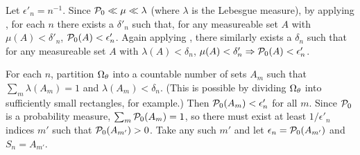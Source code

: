 \begin{lem}
%
Let $\epsilon'_n = n^{-1}$.  Since $\mathcal{P}_{0} \ll \mu \ll \lambda$ (where $\lambda$
is the Lebesgue measure), by applying \citet[Proposition
15.5]{nielsen:1997:measure}, for each $n$ there exists a $\delta'_n$ such that,
for any measureable set $A$ with $\mu(A) < \delta'_n$, $\mathcal{P}_{0}(A) <
\epsilon'_n$.  Again applying \citet[Proposition 15.5]{nielsen:1997:measure},
there similarly exists a $\delta_n$ such that for any measureable set $A$ with
$\lambda(A) < \delta_n$, $\mu(A) < \delta'_n \Rightarrow \mathcal{P}_{0}(A) <
\epsilon'_n$.

For each $n$, partition $\Omega_{\theta}$ into a countable number of sets $A_{m}$ such
that $\sum_{m} \lambda(A_{m}) = 1$ and $\lambda(A_{m}) < \delta_n$. (This is
possible by dividing $\Omega_{\theta}$ into sufficiently small rectangles, for
example.)  Then $\mathcal{P}_{0}(A_{m}) < \epsilon'_n$ for all $m$.  Since $\mathcal{P}_{0}$ is a
probability measure, $\sum_m \mathcal{P}_{0}(A_{m}) = 1$, so there must exist at least $1 /
\epsilon'_n$ indices $m'$ such that $\mathcal{P}_{0}(A_{m'}) > 0$. Take any such $m'$ and
let $\epsilon_n = \mathcal{P}_{0}(A_{m'})$ and $S_n = A_{m'}$.

%
\end{lem}
